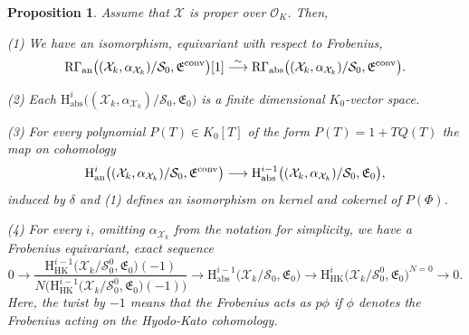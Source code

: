 \documentclass[asterisque,english]{smfart}
\newtheorem{proposition}[theo]{Proposition}
\begin{document}
\begin{proposition}\label{prop:anabs} Assume that $\mathcal{X}$ is proper over $\mathcal{O}_K$. Then, \smallskip


 (1) We have an isomorphism, equivariant with respect to Frobenius, $$\mathrm{R}\Gamma_{\mathrm{an}}\bigl((\mathcal{X}_k,\alpha_{\mathcal{X}_k})/\mathcal{S}_0,\mathfrak{E}^{\rm conv}\bigr)[1]\stackrel{\sim}{ \longrightarrow} \mathrm{R}\Gamma_{\mathrm{abs}}\bigl((\mathcal{X}_k,\alpha_{\mathcal{X}_k})/ \mathcal{S}_0,\mathfrak{E}^{\rm conv}\bigr).$$

(2) Each $\mathrm{H}^i_{\mathrm{abs}}\bigl((\mathcal{X}_k,\alpha_{\mathcal{X}_k})/ \mathcal{S}_0,\mathfrak{E}_0\bigr)$ is a finite dimensional $K_0$-vector space.

\smallskip

(3) For every polynomial $P(T)\in K_0[T]$ of the form $P(T)=1+ T Q(T)$ the map on cohomology $$\mathrm{H}^{i}_{\mathrm{an}}\bigl((\mathcal{X}_k,\alpha_{\mathcal{X}_k})/\mathcal{S}_0,\mathfrak{E}^{\rm conv}\bigr)\longrightarrow \mathrm{H}^{i-1}_{\mathrm{abs}}\bigl((\mathcal{X}_k,\alpha_{\mathcal{X}_k})/\mathcal{S}_0,\mathfrak{E}_0\bigr),$$induced by  $\delta$ and (1) defines an isomorphism on kernel and cokernel of $P(\Phi)$.

\smallskip

(4) For every $i$, omitting $\alpha_{\mathcal{X}_k}$ from the notation for simplicity, we have a Frobenius equivariant, exact sequence $$0\to \frac{\mathrm{H}^{i-1}_{\mathrm{HK}}\bigl(\mathcal{X}_k/ \mathcal{S}_0^0,\mathfrak{E}_0\bigr)(-1)}{N\bigl(\mathrm{H}^{i-1}_{\mathrm{HK}}\bigl(\mathcal{X}_k/ \mathcal{S}_0^0,\mathfrak{E}_0\bigr)(-1)\bigr)} \to \mathrm{H}^{i-1}_{\mathrm{abs}}\bigl(\mathcal{X}_k/\mathcal{S}_0,\mathfrak{E}_0\bigr) \to \mathrm{H}^i_{\mathrm{HK}}\bigl(\mathcal{X}_k/ \mathcal{S}_0^0,\mathfrak{E}_0\bigr)^{N=0} \to 0.$$
Here, the twist by $-1$ means that the Frobenius acts as $p\phi$ if $\phi$ denotes the Frobenius acting on the Hyodo-Kato cohomology.


\end{proposition}
\end{document}
